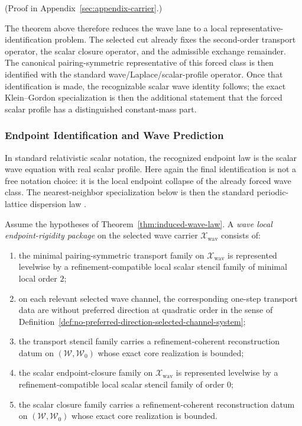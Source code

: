 (Proof in Appendix~\ref{sec:appendix-carrier}.)

The theorem above therefore reduces the wave lane to a local
representative-identification problem. The selected cut already fixes the
second-order transport operator, the scalar closure operator, and the
admissible exchange remainder. The canonical pairing-symmetric representative
of this forced class is then identified with the standard
wave/Laplace/scalar-profile operator. Once that identification is made, the
recognizable scalar wave identity follows; the exact Klein--Gordon
specialization is then the additional statement that the forced scalar profile
has a distinguished constant-mass part.

\subsubsection{Endpoint Identification and Wave Prediction}

In standard relativistic scalar notation, the recognized endpoint law is the
scalar wave equation with real scalar profile. Here again the final
identification is not a free notation choice: it is the local endpoint collapse
of the already forced wave class. The nearest-neighbor specialization below is
then the standard periodic-lattice dispersion law
\cite{Klein1926,Gordon1926,Brillouin1953}.

\begin{definition}
\label{def:wave-local-endpoint-rigidity-package}
Assume the hypotheses of Theorem~\ref{thm:induced-wave-law}. A
\emph{wave local endpoint-rigidity package} on the selected wave carrier
\(\mathcal X_{\mathrm{wav}}\) consists of:
\begin{enumerate}[label=(\roman*),itemsep=0.2em]
\item the minimal pairing-symmetric transport family on
      \(\mathcal X_{\mathrm{wav}}\) is represented levelwise by a
      refinement-compatible local scalar stencil family of minimal local order
      \(2\);
\item on each relevant selected wave channel, the corresponding one-step
      transport data are without preferred direction at quadratic order in the
      sense of
      Definition~\ref{def:no-preferred-direction-selected-channel-system};
\item the transport stencil family carries a refinement-coherent
      reconstruction datum on \((\mathcal W,\mathcal W_0)\) whose exact core
      realization is bounded;
\item the scalar endpoint-closure family on \(\mathcal X_{\mathrm{wav}}\) is
      represented levelwise by a refinement-compatible local scalar stencil
      family of order \(0\);
\item the scalar closure family carries a refinement-coherent reconstruction
      datum on \((\mathcal W,\mathcal W_0)\) whose exact core realization is
      bounded.
\end{enumerate}
\end{definition}


